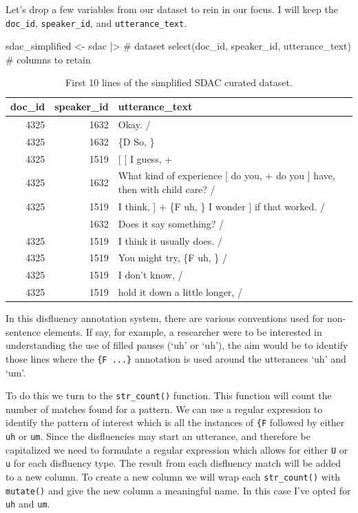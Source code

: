 \documentclass[
  letterpaper,
]{latex/krantz}
\newenvironment{Shaded}{\begin{snugshade}}{\end{snugshade}}
\newcommand{\CommentTok}[1]{\textcolor[rgb]{0.37,0.37,0.37}{#1}}
\newcommand{\FunctionTok}[1]{\textcolor[rgb]{0.28,0.35,0.67}{#1}}
\newcommand{\NormalTok}[1]{\textcolor[rgb]{0.00,0.23,0.31}{#1}}
\newcommand{\OtherTok}[1]{\textcolor[rgb]{0.00,0.23,0.31}{#1}}
\newcommand{\SpecialCharTok}[1]{\textcolor[rgb]{0.37,0.37,0.37}{#1}}
\begin{document}
Let's drop a few variables from our dataset to rein in our focus. I will
keep the \texttt{doc\_id}, \texttt{speaker\_id}, and
\texttt{utterance\_text}.

\begin{Shaded}
\begin{Highlighting}[]
\NormalTok{sdac\_simplified }\OtherTok{\textless{}{-}} 
\NormalTok{  sdac }\SpecialCharTok{|\textgreater{}} \CommentTok{\# dataset}
  \FunctionTok{select}\NormalTok{(doc\_id, speaker\_id, utterance\_text) }\CommentTok{\# columns to retain}
\end{Highlighting}
\end{Shaded}

\hypertarget{tbl-td-sdac-simple-preview}{}
\begin{table}
\caption{\label{tbl-td-sdac-simple-preview}First 10 lines of the simplified SDAC curated dataset. }\tabularnewline

\centering
\begin{tabular}{rrl}
\toprule
doc\_id & speaker\_id & utterance\_text\\
\midrule
4325 & 1632 & Okay.  /\\
4325 & 1632 & \{D So, \}\\
4325 & 1519 & {}[ [ I guess, +\\
4325 & 1632 & What kind of experience [ do you, + do you ] have, then with child care? /\\
4325 & 1519 & I think, ] + \{F uh, \} I wonder ] if that worked. /\\
\addlinespace
4325 & 1632 & Does it say something? /\\
4325 & 1519 & I think it usually does.  /\\
4325 & 1519 & You might try, \{F uh, \}  /\\
4325 & 1519 & I don't know,  /\\
4325 & 1519 & hold it down a little longer,  /\\
\bottomrule
\end{tabular}
\end{table}

In this disfluency annotation system, there are various conventions used
for non-sentence elements. If say, for example, a researcher were to be
interested in understanding the use of filled pauses (`uh' or `uh'), the
aim would be to identify those lines where the \texttt{\{F\ ...\}}
annotation is used around the utterances `uh' and `um'.

To do this we turn to the \texttt{str\_count()} function. This function
will count the number of matches found for a pattern. We can use a
regular expression to identify the pattern of interest which is all the
instances of \texttt{\{F} followed by either \texttt{uh} or \texttt{um}.
Since the disfluencies may start an utterance, and therefore be
capitalized we need to formulate a regular expression which allows for
either \texttt{U} or \texttt{u} for each disfluency type. The result
from each disfluency match will be added to a new column. To create a
new column we will wrap each \texttt{str\_count()} with
\texttt{mutate()} and give the new column a meaningful name. In this
case I've opted for \texttt{uh} and \texttt{um}.
\end{document}
